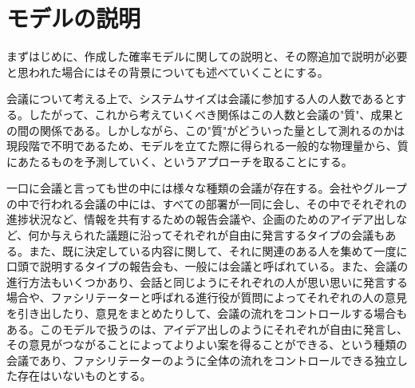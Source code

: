 \chapter{モデルの説明}

まずはじめに、作成した確率モデルに関しての説明と、その際追加で説明が必要と思われた場合にはその背景についても述べていくことにする。

会議について考える上で、システムサイズは会議に参加する人の人数であるとする。したがって、これから考えていくべき関係はこの人数と会議の"質"、成果との間の関係である。しかしながら、この"質"がどういった量として測れるのかは現段階で不明であるため、モデルを立てた際に得られる一般的な物理量から、質にあたるものを予測していく、というアプローチを取ることにする。

一口に会議と言っても世の中には様々な種類の会議が存在する。会社やグループの中で行われる会議の中には、すべての部署が一同に会し、その中でそれぞれの進捗状況など、情報を共有するための報告会議や、企画のためのアイデア出しなど、何か与えられた議題に沿ってそれぞれが自由に発言するタイプの会議もある。また、既に決定している内容に関して、それに関連のある人を集めて一度に口頭で説明するタイプの報告会も、一般には会議と呼ばれている。また、会議の進行方法もいくつかあり、会話と同じようにそれぞれの人が思い思いに発言する場合や、ファシリテーターと呼ばれる進行役が質問によってそれぞれの人の意見を引き出したり、意見をまとめたりして、会議の流れをコントロールする場合もある。このモデルで扱うのは、アイデア出しのようにそれぞれが自由に発言し、その意見がつながることによってよりよい案を得ることができる、という種類の会議であり、ファシリテーターのように全体の流れをコントロールできる独立した存在はいないものとする。

